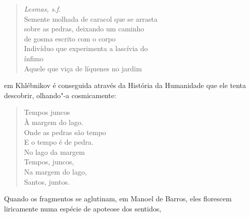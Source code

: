 \begin{verse}
\emph{Lesmas, s.f.}\\
Semente molhada de caracol que se arrasta \\
sobre as pedras, deixando um caminho \\
de gosma escrito com o corpo \\
Indivíduo que experimenta a lascívia do \\
ínfimo \\
Aquele que viça de líquenes no jardim
\end{verse}

em Khlébnikov é conseguida através da História da Humanidade que ele
tenta descobrir, olhando"-a cosmicamente:

\begin{verse}
Tempos juncos \\
À margem do lago. \\
Onde as pedras são tempo \\
E o tempo é de pedra. \\
No lago da margem \\
Tempos, juncos, \\
Na margem do lago, \\
Santos, juntos.
\end{verse}

Quando os fragmentos se aglutinam, em Manoel de Barros, eles florescem
liricamente numa espécie de apoteose dos sentidos,

